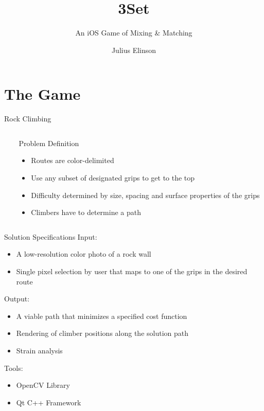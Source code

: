 \documentclass{beamer}
\author{Julius Elinson}
\title{3Set}
\subtitle{An iOS Game of Mixing \& Matching}
\institute{Aquincum Institute of Technology\\Harvey Mudd College}
\begin{document}
{
\begin{frame}
\maketitle
\end{frame}
}


\section{The Game}
\begin{frame}{Rock Climbing}
\begin{columns}

\begin{column}[T]{.5\linewidth}
\end{column}
\pause
\begin{column}[T]{.6\linewidth}
\vspace{.8cm}
Problem Definition
\begin{itemize}
 \item Routes are color-delimited
 \item Use any subset of designated grips to get to the top
 \item Difficulty determined by size, spacing and surface properties of the grips
 \item Climbers have to determine a path
\end{itemize}

\end{column}

\end{columns}
\end{frame}

\begin{frame}[t]{Solution Specifications}
Input:
\begin{itemize}
 \item A low-resolution color photo of a rock wall
 \item Single pixel selection by user that maps to one of the grips in the desired route
\end{itemize}
\vspace{.3cm}
\pause

Output:
\begin{itemize}
 \item A viable path that minimizes a specified cost function
 \item Rendering of climber positions along the solution path
 \item Strain analysis
\end{itemize}

\pause
\vspace{.3cm}
Tools:
\begin{itemize}
 \item OpenCV Library
 \item Qt C++ Framework
\end{itemize}
\end{frame}
\end{document}
